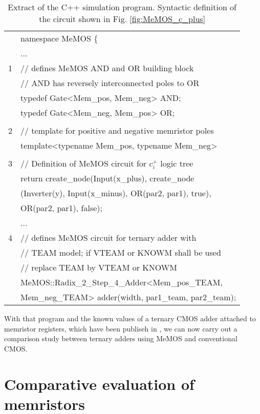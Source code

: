 \documentclass[pageno]{jpaper}
\begin{document}
\begin{table}[b]
\centering%
\begin{tabular}{cl}
       &  namespace MeMOS $\lbrace$ \\
       &  ... \\
     1 &  // defines MeMOS AND and OR building block  \\ 
       &  // AND has reversely interconnected poles to OR \\  
       &  typedef Gate<Mem\_pos, Mem\_neg> AND;\\
       &  typedef Gate<Mem\_neg, Mem\_pos> OR;\\
       &  \\
     2 &  // template for positive and negative memristor poles \\
       &  template<typename Mem\_pos, typename Mem\_neg>\\
       &  \\
     3 &  // Definition of MeMOS circuit for $c_i^+$ logic tree \\
       &  return create\_node(Input(x\_plus), create\_node\\
       &  (Inverter(y), Input(x\_minus), OR(par2, par1), true), \\
       &  OR(par2, par1), false); \\    
       &  ... \\
     4 &  // defines MeMOS circuit for ternary adder with \\
       &  // TEAM model; if VTEAM or KNOWM shall be used \\
       &  // replace TEAM by VTEAM or KNOWM \\
       &  MeMOS::Radix\_2\_Step\_4\_Adder<Mem\_pos\_TEAM, \\
       &  Mem\_neg\_TEAM> adder(width, par1\_team, par2\_team);
\end{tabular}
\caption{Extract of the C++ simulation program. Syntactic definition of the circuit shown in Fig. \ref{fig:MeMOS_c_plus}}
\label{table:Programm_extract}
\end{table} 

With that program and the known values of a ternary CMOS adder attached to memristor registers, which have been publiseh in \cite{MemSysPaper}, we can now carry out a comparison study between ternary adders using MeMOS and conventional CMOS.

\section{Comparative evaluation of memristors} 
\end{document}
